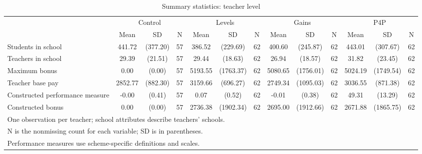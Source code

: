 \begin{table}[htbp]\centering
\def\sym#1{\ifmmode^{#1}\else\(^{#1}\)\fi}
\caption{Summary statistics: teacher level}
\begin{tabular}{l*{4}{ccc}}
\hline\hline
                    &\multicolumn{3}{c}{Control}           &\multicolumn{3}{c}{Levels}            &\multicolumn{3}{c}{Gains}             &\multicolumn{3}{c}{P4P}               \\
                    &        Mean&          SD&           N&        Mean&          SD&           N&        Mean&          SD&           N&        Mean&          SD&           N\\
\hline
Students in school  &      441.72&    (377.20)&          57&      386.52&    (229.69)&          62&      400.60&    (245.87)&          62&      443.01&    (307.67)&          62\\
Teachers in school  &       29.39&     (21.51)&          57&       29.44&     (18.63)&          62&       26.94&     (18.57)&          62&       31.82&     (23.45)&          62\\
Maximum bonus       &        0.00&      (0.00)&          57&     5193.55&   (1763.37)&          62&     5080.65&   (1756.01)&          62&     5024.19&   (1749.54)&          62\\
Teacher base pay    &     2852.77&    (882.30)&          57&     3159.66&    (696.27)&          62&     2749.34&   (1095.03)&          62&     3036.55&    (871.38)&          62\\
Constructed performance measure&       -0.00&      (0.41)&          57&        0.07&      (0.52)&          62&       -0.01&      (0.38)&          62&       49.31&     (13.29)&          62\\
Constructed bonus   &        0.00&      (0.00)&          57&     2736.38&   (1902.34)&          62&     2695.00&   (1912.66)&          62&     2671.88&   (1865.75)&          62\\
\hline\hline
\multicolumn{13}{l}{\footnotesize One observation per teacher; school attributes describe teachers' schools.}\\
\multicolumn{13}{l}{\footnotesize N is the nonmissing count for each variable; SD is in parentheses.}\\
\multicolumn{13}{l}{\footnotesize Performance measures use scheme-specific definitions and scales.}\\
\end{tabular}
\end{table}
